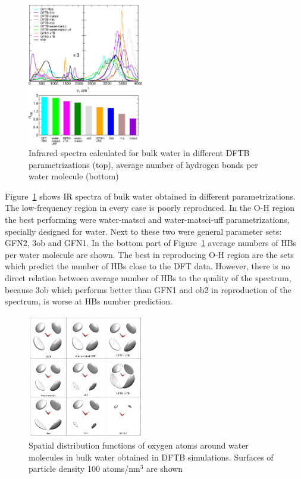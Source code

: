 \begin{figure}[ht]
    \centering
    \includegraphics[width=0.45\textwidth]{img/5-alternatives-to-aimd/2-il-h2o/ir-hb.png}
    \caption{Infrared spectra calculated for bulk water in different DFTB parametrizations (top), average number of hydrogen bonds per water molecule (bottom)}
    \label{fig:dftb-il-h2o-ir-hb}
\end{figure}

Figure~\ref{fig:dftb-il-h2o-ir-hb} shows IR spectra of bulk water obtained in different parametrizations. The low-frequency region in every case is poorly reproduced. In the O-H region the best performing were water-matsci and water-matsci-uff parametrizations, specially designed for water. Next to these two were general parameter sets: GFN2, 3ob and GFN1. In the bottom part of Figure~\ref{fig:dftb-il-h2o-ir-hb} average numbers of HBs per water molecule are shown. The best in reproducing O-H region are the sets which predict the number of HBs close to the DFT data. However, there is no direct relation between average number of HBs to the quality of the spectrum, because 3ob which performs better than GFN1 and ob2 in reproduction of the spectrum, is worse at HBs number prediction.

\begin{figure}[ht]
    \centering
    \includegraphics[width=0.45\textwidth]{img/5-alternatives-to-aimd/2-il-h2o/sdf-water.png}
    \caption{Spatial distribution functions of oxygen atoms around water molecules in bulk water obtained in DFTB simulations. Surfaces of particle density 100 atoms/nm$^3$ are shown}
    \label{fig:dftb-il-h2o-sdf-water}
\end{figure}

